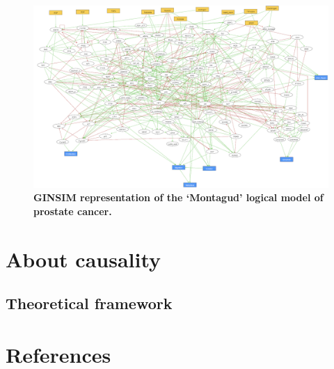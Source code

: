 \documentclass[a4paper,12pt,twoside,onecolumn,openright,final,oldfontcommands]{memoir}
\begin{document}
\begin{figure}

{\centering \includegraphics[width=0.9\linewidth]{fig/Montagud} 

}

\caption[Graphical abstract of PROFILE method to personalize logical models with omics data]{\textbf{GINSIM representation of the `Montagud'
logical model of prostate cancer.}}\label{fig:Montagud}
\end{figure}




\chapter{About causality}\label{about-causality}

\section{Theoretical framework}\label{theoretical-framework}

\chapter*{References}\label{references}


\setlength{\parindent}{-0.5in} \setlength{\leftskip}{0.5in}
\setlength{\parskip}{8pt}


\end{document}
